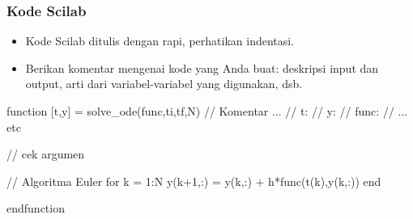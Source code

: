 \documentclass[bahasa,10pt]{beamer}
\begin{document}
\begin{frame}[fragile]
\frametitle{Kode Scilab}

\begin{itemize}
\item Kode Scilab ditulis dengan rapi, perhatikan indentasi.
\item Berikan komentar mengenai kode yang Anda buat: deskripsi input dan output,
arti dari variabel-variabel yang digunakan, dsb.
\end{itemize}

\begin{scilabcode}
function [t,y] = solve_ode(func,ti,tf,N)
// Komentar ...
// t: 
// y:
// func:
// ... etc

  // cek argumen

  // Algoritma Euler
  for k = 1:N
    y(k+1,:) = y(k,:) + h*func(t(k),y(k,:))
  end

endfunction
\end{scilabcode}


\end{frame}
\end{document}
